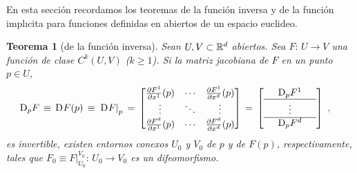 \theoremstyle{plain}
\newtheorem{teoFunInversa}{Teorema}[section]
\newtheorem{coroFunInversa}[teoFunInversa]{Corolario}
\newtheorem{teoFunImplicita}[teoFunInversa]{Teorema}

\theoremstyle{remark}


En esta secci\'{o}n recordamos los teoremas de la funci\'{o}n inversa y
de la funci\'{o}n impl{\i}cita para funciones definidas en abiertos
de un espacio euclideo.

\begin{teoFunInversa}[de la funci\'{o}n inversa]\label{thm:funinversa}
	Sean $U,V\subset\bb{R}^{d}$ abiertos. Sea $F:\,U\rightarrow V$ una
	funci\'{o}n de clase $C^{k}(U,V)$ ($k\geq 1$). Si la matriz
	jacobiana de $F$ en un punto $p\in U$,
	\begin{align*}
		\jacobiana[p]{F} & \,\equiv\,\jacobiana{F}(p)\,\equiv\,
			\left.\jacobiana{F}\right|_{p}
		\,=\,	\begin{bmatrix}
				\derivada{F^{1}}{x^{1}}(p) & \cdots &
					\derivada{F^{1}}{x^{d}}(p) \\
				\vdots & \ddots & \vdots \\
				\derivada{F^{d}}{x^{1}}(p) & \cdots &
					\derivada{F^{d}}{x^{d}}(p)
			\end{bmatrix}
		\,=\,	\left[
			\begin{array}{ccc}
				& \jacobiana[p]{F^{1}} & \\
				\hline
				& \vdots & \\
				\hline
				& \jacobiana[p]{F^{d}} &
			\end{array}
			\right]
		\text{ ,}
	\end{align*}
	es invertible, existen entornos conexos $U_{0}$ y $V_{0}$ de
	$p$ y de $F(p)$, respectivamente, tales que
	$F_{0}\equiv F|_{U_{0}}^{V_{0}}:\,U_{0}\rightarrow V_{0}$
	es un difeomorfismo.
\end{teoFunInversa}


